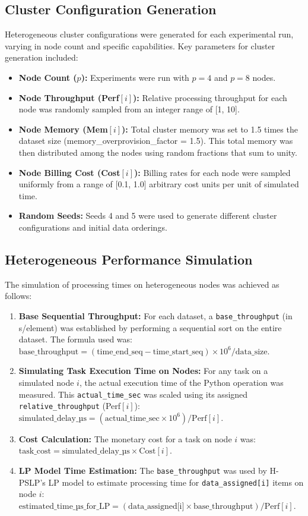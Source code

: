 \documentclass[]{interact}
\theoremstyle{plain}
\theoremstyle{definition}
\theoremstyle{remark}
\begin{document}
\subsection{Cluster Configuration Generation}
Heterogeneous cluster configurations were generated for each experimental run, varying in node count and specific capabilities. Key parameters for cluster generation included:
\begin{itemize}
    \item \textbf{Node Count ($p$):} Experiments were run with $p=4$ and $p=8$ nodes.
    \item \textbf{Node Throughput (Perf$[i]$):} Relative processing throughput for each node was randomly sampled from an integer range of [1, 10].
    \item \textbf{Node Memory (Mem$[i]$):} Total cluster memory was set to 1.5 times the dataset size (memory\_overprovision\_factor = 1.5). This total memory was then distributed among the nodes using random fractions that sum to unity.
    \item \textbf{Node Billing Cost (Cost$[i]$):} Billing rates for each node were sampled uniformly from a range of [0.1, 1.0] arbitrary cost units per unit of simulated time.
    \item \textbf{Random Seeds:} Seeds 4 and 5 were used to generate different cluster configurations and initial data orderings.
\end{itemize}

\subsection{Heterogeneous Performance Simulation}
The simulation of processing times on heterogeneous nodes was achieved as follows:
\begin{enumerate}
    \item \textbf{Base Sequential Throughput:} For each dataset, a \texttt{base\_throughput} (in \textmu{}s/element) was established by performing a sequential sort on the entire dataset. The formula used was:
    $\text{base\_throughput} = (\text{time\_end\_seq} - \text{time\_start\_seq}) \times 10^6 / \text{data\_size}$.
    \item \textbf{Simulating Task Execution Time on Nodes:} For any task on a simulated node $i$, the actual execution time of the Python operation was measured. This \texttt{actual\_time\_sec} was scaled using its assigned \texttt{relative\_throughput} (Perf$[i]$):
    $\text{simulated\_delay\_µs} = (\text{actual\_time\_sec} \times 10^6) / \text{Perf}[i]$.
    \item \textbf{Cost Calculation:} The monetary cost for a task on node $i$ was:
    $\text{task\_cost} = \text{simulated\_delay\_µs} \times \text{Cost}[i]$.
    \item \textbf{LP Model Time Estimation:} The \texttt{base\_throughput} was used by H-PSLP's LP model to estimate processing time for \texttt{data\_assigned[i]} items on node $i$:
    $\text{estimated\_time\_µs\_for\_LP} = (\text{data\_assigned[i]} \times \text{base\_throughput}) / \text{Perf}[i]$.
\end{enumerate}
\end{document}

